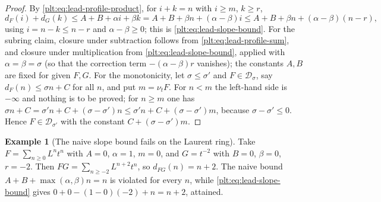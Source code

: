 \documentclass[11pt,oneside]{article}
\theoremstyle{plain}
\theoremstyle{definition}
\newtheorem{example}[theorem]{Example}
\theoremstyle{remark}
\newcommand{\ordt}{\nu_{t}}                              %
\newcommand{\dprofile}[1]{d_{#1}}                        %
\begin{document}
\begin{proof}
By \eqref{plt:eq:lead-profile-product}, for \(i+k=n\) with \(i\ge m\),
\(k\ge r\),
\[
  \dprofile{F}(i)+\dprofile{G}(k)
  \le A+B+\alpha i+\beta k
  = A+B+\beta n+(\alpha-\beta)i
  \le A+B+\beta n+(\alpha-\beta)(n-r),
\]
using \(i=n-k\le n-r\) and \(\alpha-\beta\ge0\); this is
\eqref{plt:eq:lead-slope-bound}.  For the subring claim, closure under
subtraction follows from \eqref{plt:eq:lead-profile-sum}, and closure under
multiplication from \eqref{plt:eq:lead-slope-bound}, applied with
\(\alpha=\beta=\sigma\) (so that the correction term \(-(\alpha-\beta)r\)
vanishes); the constants \(A,B\) are fixed for given \(F,G\).
For the monotonicity, let \(\sigma\le\sigma'\) and
\(F\in\mathcal D_\sigma\), say \(\dprofile{F}(n)\le\sigma n+C\) for all \(n\),
and put \(m=\ordt F\).  For \(n<m\) the left-hand side is \(-\infty\) and
nothing is to be proved; for \(n\ge m\) one has
\(\sigma n+C=\sigma'n+C+(\sigma-\sigma')n\le\sigma'n+C+(\sigma-\sigma')m\),
because \(\sigma-\sigma'\le0\).  Hence \(F\in\mathcal D_{\sigma'}\) with the
constant \(C+(\sigma-\sigma')m\).
\end{proof}

\begin{example}[The naive slope bound fails on the Laurent ring]
\label{plt:ex:lead-slope-fails}
Take \(F=\sum_{n\ge0}L^nt^n\) with \(A=0\), \(\alpha=1\), \(m=0\), and
\(G=t^{-2}\) with \(B=0\), \(\beta=0\), \(r=-2\).  Then
\(FG=\sum_{n\ge-2}L^{n+2}t^{n}\), so \(\dprofile{FG}(n)=n+2\).  The naive
bound \(A+B+\max(\alpha,\beta)n=n\) is violated for every \(n\), while
\eqref{plt:eq:lead-slope-bound} gives \(0+0-(1-0)(-2)+n=n+2\), attained.
\end{example}
\end{document}
